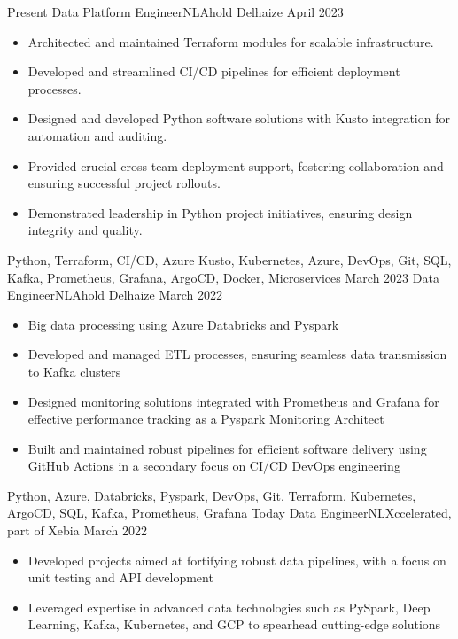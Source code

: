 \begin{experiences}
  \experience
  {Present}   {Data Platform Engineer}{NL}{Ahold Delhaize}
  {April 2023} {
    \begin{itemize}
      \item Architected and maintained Terraform modules for scalable infrastructure.
      \item Developed and streamlined CI/CD pipelines for efficient deployment processes.
      \item Designed and developed Python software solutions with Kusto integration for automation and auditing.
      \item Provided crucial cross-team deployment support, fostering collaboration and ensuring successful project rollouts.
      \item Demonstrated leadership in Python project initiatives, ensuring design integrity and quality.
    \end{itemize}
  }
  {Python, Terraform, CI/CD, Azure Kusto, Kubernetes, Azure, DevOps, Git, SQL, Kafka, Prometheus, Grafana, ArgoCD, Docker, Microservices}
  \emptySeparator
  \experience
  {March 2023}   {Data Engineer}{NL}{Ahold Delhaize}
  {March 2022} {
    \begin{itemize}
      \item Big data processing using Azure Databricks and Pyspark
      \item Developed and managed ETL processes, ensuring seamless data transmission to Kafka clusters
      \item Designed monitoring solutions integrated with Prometheus and Grafana for effective performance tracking as a Pyspark Monitoring Architect
      \item Built and maintained robust pipelines for efficient software delivery using GitHub Actions in a secondary focus on CI/CD DevOps engineering
    \end{itemize}
  }
  {Python, Azure, Databricks, Pyspark, DevOps, Git, Terraform, Kubernetes, ArgoCD, SQL, Kafka, Prometheus, Grafana}
  \emptySeparator
  \experience
  {Today}   {Data Engineer}{NL}{Xccelerated, part of Xebia}
  {March 2022} {
    \begin{itemize}
      \item Developed projects aimed at fortifying robust data pipelines, with a focus on unit testing and API development
      \item Leveraged expertise in advanced data technologies such as PySpark, Deep Learning, Kafka, Kubernetes, and GCP to spearhead cutting-edge solutions

\end{itemize}}
\end{experiences}
